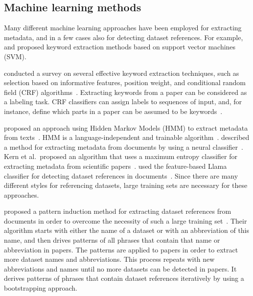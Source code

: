 \documentclass{IOS-Book-Article}
\begin{document}
\subsection{Machine learning methods}
Many different machine learning approaches have been employed for extracting metadata, and in a few cases also for detecting dataset references.
For example, \citeauthor{Zhang2006} \citeyearpar{Zhang2006} and \citeauthor{Han2003} \citeyearpar{Han2003} proposed keyword extraction methods based on support vector machines (SVM). 

\citeauthor{Kaur2010} conducted a survey on several effective keyword extraction techniques, such as selection based on informative features, position weight, and conditional random field (CRF) algorithms~\citeyearpar{Kaur2010}.
Extracting keywords from a paper can be considered as a labeling task.
CRF classifiers can assign labels to sequences of input, and, for instance, define which parts in a paper can be assumed to be keywords~\citep{ZHANG2008}.

\citeauthor{Cui2010} proposed an approach using Hidden Markov Models (HMM) to extract metadata from texts~\citeyearpar{Cui2010}. 
HMM is a language-independent and trainable algorithm~\cite{Kubala1998}.
\citeauthor{Marinai2009} described a method for extracting metadata from documents by using a neural classifier~\citeyearpar{Marinai2009}.
Kern et al.\ proposed an algorithm that uses a maximum entropy classifier for extracting metadata from scientific papers~\cite{Kern2012}.
\citeauthor{MeiyuLu2012} used the feature-based Llama classifier for detecting dataset references in documents~\citeyearpar{MeiyuLu2012}.
Since there are many different styles for referencing datasets, large training sets are necessary for these approaches.

\citeauthor{Boland2012} proposed a pattern induction method for extracting dataset references from documents in order to overcome the necessity of such a large training set~\citeyearpar{Boland2012}.
Their algorithm starts with either the name of a dataset or with an abbreviation of this name, and then drives patterns of all phrases that contain that name or abbreviation in papers.
The patterns are applied to papers in order to extract more dataset names and abbreviations.
This process repeats with new abbreviations and names until no more datasets can be detected in papers.
It derives patterns of phrases that contain dataset references iteratively by using a bootstrapping approach.
\end{document}
